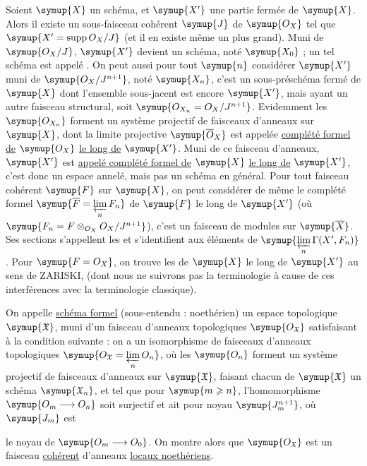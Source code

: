 Soient $\symup{X}$ un schéma, et $\symup{X'}$ une partie fermée de $\symup{X}$. Alors il existe un
sous-faisceau cohérent $\symup{J}$ de $\symup{O_X}$ tel que
$\symup{X'=\operatorname{supp}O_X/J}$ (et il en existe même un plus grand). Muni
de $\symup{O_X/J}$, $\symup{X'}$ devient un schéma, noté $\symup{X_0}$ ; un tel schéma est appelé
. On peut aussi pour tout $\symup{n}$ considérer $\symup{X'}$ muni
de $\symup{O_X/J^{n+1}}$, noté $\symup{X_n}$, c'est un sous-préschéma fermé de $\symup{X}$ dont
l'ensemble sous-jacent est encore $\symup{X'}$, mais ayant un autre faisceau
structural, soit $\symup{O_{X_n}=O_X/J^{n+1}}$. Evidemment les $\symup{O_{X_n}}$
forment un système projectif de faisceaux d'anneaux sur $\symup{X}$, dont la limite
projective $\symup{\overline{O}_X}$ est appelée \uline{complété formel de} $\symup{O_X}$ \uline{le
long de} $\symup{X'}$. Muni de ce faisceau d'anneaux, $\symup{X'}$ est \uline{appelé
complété formel de} $\symup{X}$ \uline{le long de} $\symup{X'}$, c'est donc un espace annelé,
mais pas un schéma en général. Pour tout faisceau cohérent $\symup{F}$ sur $\symup{X}$, on peut
considérer de même le complété formel
$\symup{\overline F=\varprojlim\limits_n F_n}$ de $\symup{F}$ le long de $\symup{X'}$ (où
$\symup{F_n=F\otimes_{O_X}O_X/J^{n+1}}$), c'est un faisceau de modules sur
$\symup{\overline X}$. Ses sections s'appellent les  et s'identifient aux éléments de
$\symup{\varprojlim\limits_n\Gamma(X',F_n)}$. Pour $\symup{F=O_X}$, on trouve les  de $\symup{X}$ le long de $\symup{X'}$ au sens de ZARISKI, (dont nous ne suivrons
pas la terminologie à cause de ces interférences avec la terminologie
classique).

On appelle \uline{schéma formel} (sous-entendu : noethérien) un espace
topologique $\symup{\mathfrak X}$, muni d'un faisceau d'anneaux topologiques
$\symup{O_{\mathfrak X}}$ satisfaisant à la condition suivante : on a un
isomorphisme de faisceaux d'anneaux topologiques
$\symup{O_{\mathfrak X}=\varprojlim\limits_nO_n}$, où les $\symup{O_n}$ forment un système
projectif de faisceaux d'anneaux sur $\symup{\mathfrak X}$, faisant chacun de
$\symup{\mathfrak X}$ un schéma $\symup{\mathfrak X_n}$, et tel que pour $\symup{m\geqslant n}$,
l'homomorphisme $\symup{O_m\longrightarrow O_n}$ soit surjectif et ait pour noyau
$\symup{J_m^{n+1}}$, où $\symup{J_m}$ est

le noyau de $\symup{O_m\longrightarrow O_0}$. On montre alors que
$\symup{O_{\mathfrak X}}$ est un faisceau \uline{cohérent} d'anneaux \uline{locaux
noethériens}.


